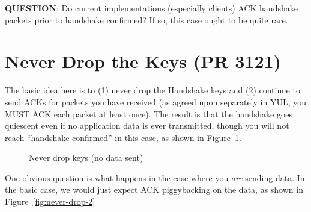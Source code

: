 \documentclass{article}
\begin{document}
\textbf{QUESTION}: Do current implementations (especially clients)
ACK handshake packets prior to handshake confirmed? If so,
this case ought to be quite rare.


\section{Never Drop the Keys (PR 3121)}
\label{sec:never-drop-keys}

The basic idea here is to (1) never drop the Handshake keys
and (2) continue to send ACKs for packets you have received
(as agreed upon separately in YUL, you MUST ACK each
packet at least once). The result is that the handshake
goes quiescent even if no application data is ever transmitted,
though you will not reach ``handshake confirmed'' in this
case, as shown in Figure~\ref{fig:never-drop-1}.

\begin{figure}[H]
\begin{center}
\end{center}
\caption{Never drop keys (no data sent)}
\label{fig:never-drop-1}
\end{figure}


One obvious question is what happens in the case where you
\emph{are} sending data. In the basic case, we would just
expect ACK piggybacking on the data, as shown in Figure~\ref{fig:never-drop-2}
\end{document}
